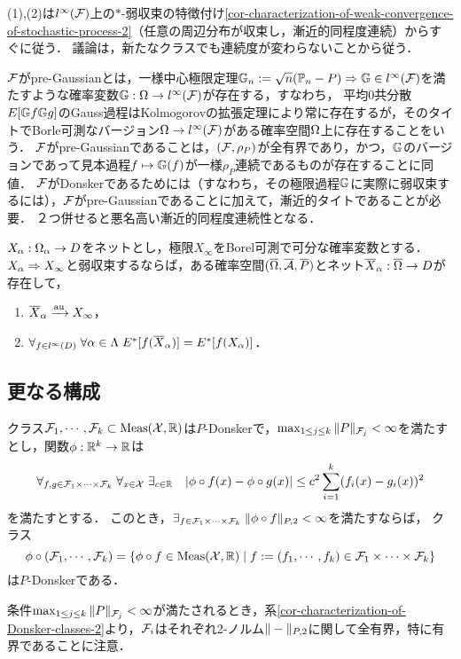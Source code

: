 \documentclass[uplatex,dvipdfmx]{jsreport}
\begin{document}
\begin{remarks}
    (1),(2)は$l^\infty(\mathcal{F})$上の$*$-弱収束の特徴付け\ref{cor-characterization-of-weak-convergence-of-stochastic-process-2}（任意の周辺分布が収束し，漸近的同程度連続）からすぐに従う．
    議論は，新たなクラスでも連続度が変わらないことから従う．

    $\mathcal{F}$がpre-Gaussianとは，一様中心極限定理$\mathbb{G}_n:=\sqrt{n}(\mathbb{P}_n-P)\Rightarrow\mathbb{G}\in l^\infty(\mathcal{F})$を満たすような確率変数$\mathbb{G}:\Omega\to l^\infty(\mathcal{F})$が存在する，すなわち，
    平均$0$共分散$E[\mathbb{G} f\mathbb{G} g]$のGauss過程はKolmogorovの拡張定理により常に存在するが，そのタイトでBorle可測なバージョン$\Omega\to l^\infty(\mathcal{F})$がある確率空間$\Omega$上に存在することをいう．
    $\mathcal{F}$がpre-Gaussianであることは，$(\mathcal{F},\rho_P)$が全有界であり，かつ，$\mathbb{G}$のバージョンであって見本過程$f\mapsto\mathbb{G}(f)$が一様$\rho_P$連続であるものが存在することに同値．
    $\mathcal{F}$がDonskerであるためには（すなわち，その極限過程$\mathbb{G}$に実際に弱収束するには），$\mathcal{F}$がpre-Gaussianであることに加えて，漸近的タイトであることが必要．
    ２つ併せると悪名高い漸近的同程度連続性となる．
\end{remarks}

\begin{theorem}
    $X_\alpha:\Omega_\alpha\to D$をネットとし，極限$X_\infty$をBorel可測で可分な確率変数とする．$X_\alpha\Rightarrow X_\infty$と弱収束するならば，ある確率空間$(\overline{\Omega},\overline{\mathcal{A}},\overline{P})$とネット$\overline{X}_\alpha:\overline{\Omega}\to D$が存在して，
    \begin{enumerate}
        \item $\overline{X}_\alpha\xrightarrow{\mathrm{au}}X_\infty$，
        \item $\forall_{f\in l^\infty(D)}\;\forall{\alpha\in\Lambda}\;E^*[f(\overline{X}_\alpha)]=E^*[f(X_\alpha)]$．
    \end{enumerate}
\end{theorem}

\subsection{更なる構成}

\begin{theorem}
    クラス$\mathcal{F}_1,\cdots,\mathcal{F}_k\subset\mathrm{Meas}(\mathcal{X},\mathbb{R})$は$P$-Donskerで，$\max_{1\le j\le k}\|P\|_{\mathcal{F}_j}<\infty$を満たすとし，関数$\phi:\mathbb{R}^k\to\mathbb{R}$は
    \[\forall_{f,g\in\mathcal{F}_1\times\cdots\times\mathcal{F}_k}\;\forall_{x\in\mathcal{X}}\;\exists_{c\in\mathbb{R}}\quad\lvert\phi\circ f(x)-\phi\circ g(x)\rvert\le c^2\sum^k_{i=1}(f_i(x)-g_i(x))^2\]
    を満たすとする．
    このとき，$\exists_{f\in\mathcal{F}_1\times\cdots\times\mathcal{F}_k}\;\|\phi\circ f\|_{P,2}<\infty$を満たすならば，
    クラス
    \[\phi\circ(\mathcal{F}_1,\cdots,\mathcal{F}_k)=\left\{\phi\circ f\in\mathrm{Meas}(\mathcal{X},\mathbb{R})\mid f:=(f_1,\cdots,f_k)\in\mathcal{F}_1\times\cdots\times\mathcal{F}_k\right\}\]
    は$P$-Donskerである．
\end{theorem}
\begin{remark}
    条件$\max_{1\le j\le k}\|P\|_{\mathcal{F}_j}<\infty$が満たされるとき，系\ref{cor-characterization-of-Donsker-classes-2}より，$\mathcal{F}_i$はそれぞれ2-ノルム$\|-\|_{P,2}$に関して全有界，特に有界であることに注意．

\end{remark}
\end{document}
